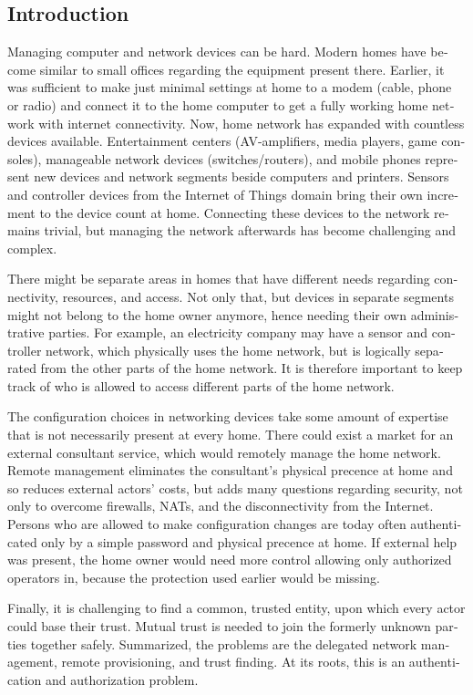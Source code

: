 \documentclass[12pt,a4paper,english]{tutthesis}
\begin{document}
\begin{otherlanguage}{english}
\chapter{Introduction}
\label{sec-1}
\label{cha:intro}


Managing computer and network devices can be hard.  Modern homes have
become similar to small offices regarding the equipment present there.
Earlier, it was sufficient to make just minimal settings at home to a
modem (cable, phone or radio) and connect it to the home computer to
get a fully working home network with internet connectivity.  Now, home
network has expanded with countless devices available. 
Entertainment centers (AV-amplifiers, media players, game consoles),
manageable network devices (switches/routers), and mobile phones
represent new devices and network segments beside computers and
printers. Sensors and controller devices from the Internet of Things
domain bring their own increment to the device count at home.
Connecting these devices to the network remains trivial, but managing the
network afterwards has become challenging and complex.

There might be separate areas in homes that have different needs regarding
connectivity, resources, and access. Not only that, but devices in
separate segments might not belong to the home owner anymore, hence needing
their own administrative parties. For example, an electricity company may
have a sensor and controller network, which physically uses the home network, but
is logically separated from the other parts of the home network. It is therefore
important to keep track of who is allowed to access different parts of the
home network. 


The configuration choices in networking devices take some
amount of expertise that is not necessarily present at every
home. There could exist a market for an external consultant service, which would
remotely manage the home network.
Remote management eliminates the consultant's 
physical precence at home and so reduces external actors' costs, but adds many questions
regarding security, not only to overcome firewalls, NATs, and
the disconnectivity from the Internet.
Persons who are allowed to make configuration changes are today
often authenticated only by a simple password and physical precence at home.
If external help was present, the home owner would need more 
control allowing only authorized operators in, because the 
protection used earlier would be missing.

Finally, it is challenging to find a common, 
trusted entity, upon which every actor could base their trust.
Mutual trust
 is needed to join the formerly unknown parties together
safely. 
Summarized, the problems are the delegated network management, remote
provisioning, and trust finding. At its roots, this is an authentication
and authorization problem.









\end{otherlanguage}
\end{document}
